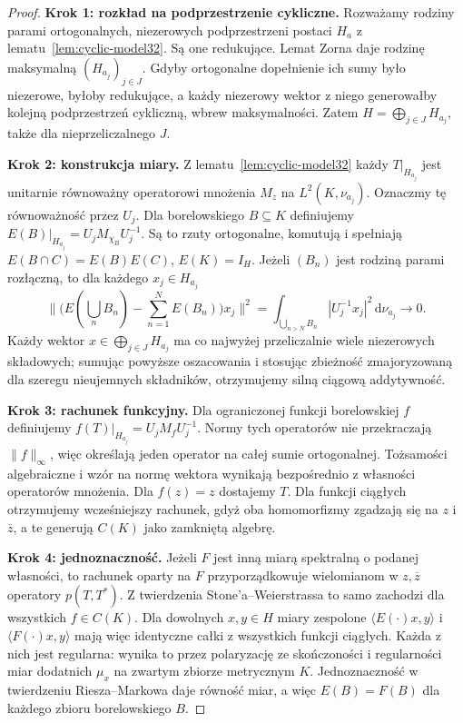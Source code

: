 \documentclass[11pt,a4paper]{article}
\numberwithin{equation}{section}
\theoremstyle{plain}
\theoremstyle{definition}
\theoremstyle{remark}
\begin{document}
\begin{proof}
\textbf{Krok 1: rozkład na podprzestrzenie cykliczne.}
Rozważamy rodziny parami ortogonalnych, niezerowych podprzestrzeni
postaci $H_a$ z lematu~\ref{lem:cyclic-model32}. Są one redukujące.
Lemat Zorna daje rodzinę maksymalną $(H_{a_j})_{j\in J}$.
Gdyby ortogonalne dopełnienie ich sumy było niezerowe,
byłoby redukujące, a każdy niezerowy wektor z niego generowałby
kolejną podprzestrzeń cykliczną, wbrew maksymalności.
Zatem $H=\bigoplus_{j\in J}H_{a_j}$, także dla nieprzeliczalnego $J$.

\textbf{Krok 2: konstrukcja miary.}
Z lematu~\ref{lem:cyclic-model32} każdy $T|_{H_{a_j}}$
jest unitarnie równoważny operatorowi mnożenia $M_z$ na
$L^2(K,\nu_{a_j})$. Oznaczmy tę równoważność przez $U_j$.
Dla borelowskiego $B\subseteq K$ definiujemy
$E(B)|_{H_{a_j}}=U_jM_{\chi_B}U_j^{-1}$.
Są to rzuty ortogonalne, komutują i spełniają
$E(B\cap C)=E(B)E(C)$, $E(K)=I_H$. Jeżeli $(B_n)$ jest
rodziną parami rozłączną, to dla każdego $x_j\in H_{a_j}$
\[
 \bigl\|\bigl(E(\textstyle\bigcup_n B_n)
 -\sum_{n=1}^{N}E(B_n)\bigr)x_j\bigr\|^2
 =\int_{\bigcup_{n>N}B_n}|U_j^{-1}x_j|^2\,\mathrm d\nu_{a_j}
 \longrightarrow0.
\]
Każdy wektor $x\in\bigoplus_{j\in J}H_{a_j}$ ma co najwyżej
przeliczalnie wiele niezerowych składowych; sumując powyższe
oszacowania i stosując zbieżność zmajoryzowaną dla szeregu
nieujemnych składników, otrzymujemy silną ciągową addytywność.

\textbf{Krok 3: rachunek funkcyjny.}
Dla ograniczonej funkcji borelowskiej $f$ definiujemy
$f(T)|_{H_{a_j}}=U_jM_fU_j^{-1}$.
Normy tych operatorów nie przekraczają $\|f\|_\infty$,
więc określają jeden operator na całej sumie ortogonalnej.
Tożsamości algebraiczne i wzór na normę wektora wynikają
bezpośrednio z własności operatorów mnożenia.
Dla $f(z)=z$ dostajemy $T$. Dla funkcji ciągłych
otrzymujemy wcześniejszy rachunek, gdyż oba homomorfizmy
zgadzają się na $z$ i $\overline z$, a te generują
$C(K)$ jako zamkniętą algebrę.

\textbf{Krok 4: jednoznaczność.}
Jeżeli $F$ jest inną miarą spektralną o podanej własności,
to rachunek oparty na $F$ przyporządkowuje wielomianom
w $z,\overline z$ operatory $p(T,T^*)$.
Z twierdzenia Stone'a--Weierstrassa to samo zachodzi
dla wszystkich $f\in C(K)$. Dla dowolnych $x,y\in H$
miary zespolone $\langle E(\cdot)x,y\rangle$ i
$\langle F(\cdot)x,y\rangle$ mają więc identyczne całki
z wszystkich funkcji ciągłych. Każda z nich jest regularna:
wynika to przez polaryzację ze skończoności i regularności
miar dodatnich $\mu_x$ na zwartym zbiorze metrycznym $K$.
Jednoznaczność w twierdzeniu Riesza--Markowa daje
równość miar, a więc $E(B)=F(B)$ dla każdego zbioru
borelowskiego $B$.
\end{proof}
\end{document}
